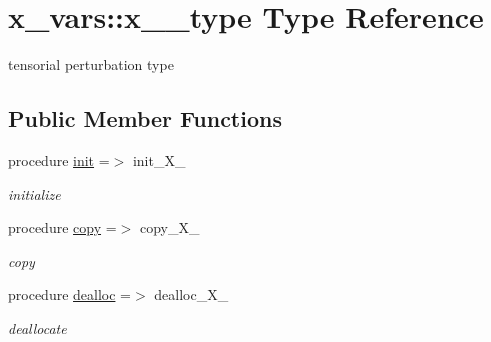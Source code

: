 \hypertarget{structx__vars_1_1x__2__type}{}\section{x\+\_\+vars\+:\+:x\+\_\+\_\+type Type Reference}
\label{structx__vars_1_1x__2__type}


tensorial perturbation type  


\subsection*{Public Member Functions}
\begin{DoxyCompactItemize}
\item 
procedure \hyperlink{structx__vars_1_1x__2__type_ac3a132afc759fb6a00e53240fba9266e}{init} =$>$ init\+\_\+\+X\+\_
\begin{DoxyCompactList}\small\item\em initialize \end{DoxyCompactList}\item 
procedure \hyperlink{structx__vars_1_1x__2__type_ae52df438c7be00a5cfe07c58ffe637d1}{copy} =$>$ copy\+\_\+\+X\+\_
\begin{DoxyCompactList}\small\item\em copy \end{DoxyCompactList}\item 
procedure \hyperlink{structx__vars_1_1x__2__type_a085972ba0d2b6930a028164cc42e1cec}{dealloc} =$>$ dealloc\+\_\+\+X\+\_
\begin{DoxyCompactList}\small\item\em deallocate \end{DoxyCompactList}\end{DoxyCompactItemize}
